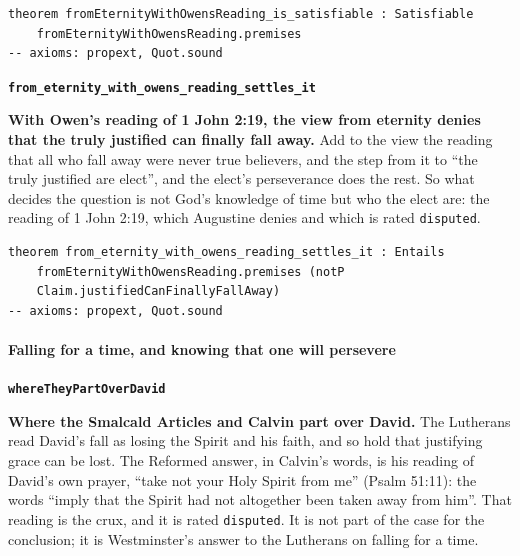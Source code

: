 \documentclass[11pt]{article}
\begin{document}
{\small\begin{verbatim}
theorem fromEternityWithOwensReading_is_satisfiable : Satisfiable
    fromEternityWithOwensReading.premises
-- axioms: propext, Quot.sound
\end{verbatim}}
\par\medskip\noindent\textbf{\texttt{from\_\allowbreak{}eternity\_\allowbreak{}with\_\allowbreak{}owens\_\allowbreak{}reading\_\allowbreak{}settles\_\allowbreak{}it}}\par\nobreak\noindent
\textbf{With Owen’s reading of 1 John 2:19, the view from eternity denies that the truly justified can finally fall away.} Add to the view the reading that all who fall away were never true believers, and the step from it to “the truly justified are elect”, and the elect’s perseverance does the rest. So what decides the question is not God’s knowledge of time but who the elect are: the reading of 1 John 2:19, which Augustine denies and which is rated \texttt{disputed}.

{\small\begin{verbatim}
theorem from_eternity_with_owens_reading_settles_it : Entails
    fromEternityWithOwensReading.premises (notP
    Claim.justifiedCanFinallyFallAway)
-- axioms: propext, Quot.sound
\end{verbatim}}
\paragraph*{Falling for a time, and knowing that one will persevere}
\leavevmode\par\nobreak
\par\medskip\noindent\textbf{\texttt{where\allowbreak{}They\allowbreak{}Part\allowbreak{}Over\allowbreak{}David}}\par\nobreak\noindent
\textbf{Where the Smalcald Articles and Calvin part over David.} The Lutherans read David’s fall as losing the Spirit and his faith, and so hold that justifying grace can be lost. The Reformed answer, in Calvin’s words, is his reading of David’s own prayer, “take not your Holy Spirit from me” (Psalm 51:11): the words “imply that the Spirit had not altogether been taken away from him”. That reading is the crux, and it is rated \texttt{disputed}. It is not part of the case for the conclusion; it is Westminster’s answer to the Lutherans on falling for a time.
\end{document}
